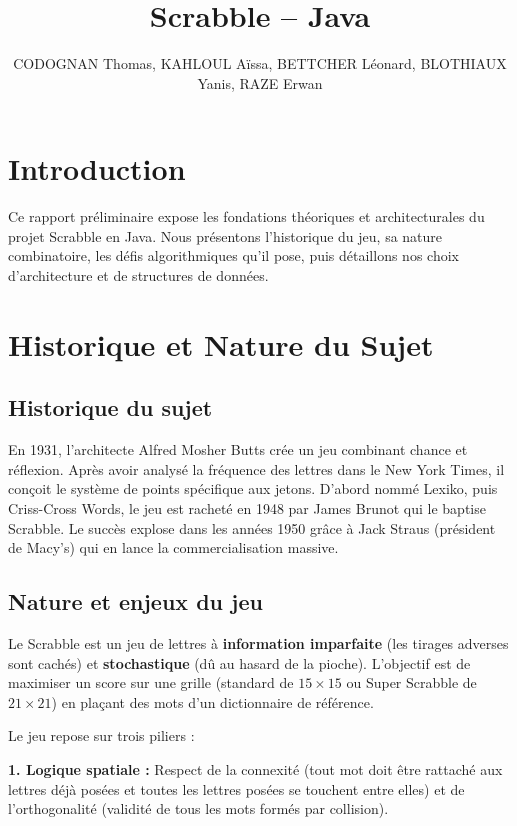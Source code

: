 \documentclass[a4paper]{article}
\title{Scrabble -- Java}
\author{CODOGNAN Thomas, KAHLOUL Aïssa, BETTCHER Léonard, BLOTHIAUX Yanis, RAZE Erwan}
\begin{document}
\maketitle

\section*{Introduction}
\hangindent=0.8mm
Ce rapport préliminaire expose les fondations théoriques et architecturales du projet Scrabble en Java. Nous présentons l'historique du jeu, sa nature combinatoire, les défis algorithmiques qu'il pose, puis détaillons nos choix d'architecture et de structures de données.

\section{Historique et Nature du Sujet}

\subsection{Historique du sujet}
\hangindent=0.8mm
En 1931, l'architecte Alfred Mosher Butts crée un jeu combinant chance et réflexion. Après avoir analysé la fréquence des lettres dans le New York Times, il conçoit le système de points spécifique aux jetons. D’abord nommé Lexiko, puis Criss-Cross Words, le jeu est racheté en 1948 par James Brunot qui le baptise Scrabble. Le succès explose dans les années 1950 grâce à Jack Straus (président de Macy's) qui en lance la commercialisation massive. 
\vspace{1\baselineskip}

\subsection{Nature et enjeux du jeu}
\hangindent=0.8mm
Le Scrabble est un jeu de lettres à \textbf{information imparfaite} (les tirages adverses sont cachés) et \textbf{stochastique} (dû au hasard de la pioche). L'objectif est de maximiser un score sur une grille (standard de $15 \times 15$ ou Super Scrabble de $21 \times 21$) en plaçant des mots d'un dictionnaire de référence.

\hangindent=0.8mm
Le jeu repose sur trois piliers :

\hangindent=1.5cm
\textbf{1. Logique spatiale :} Respect de la connexité (tout mot doit être rattaché aux lettres déjà posées et toutes les lettres posées se touchent entre elles) et de l'orthogonalité (validité de tous les mots formés par collision).
\end{document}
